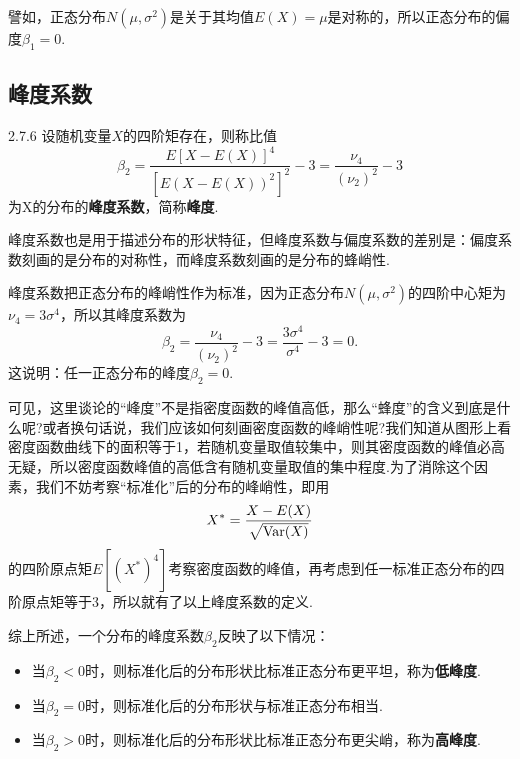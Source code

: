 譬如，正态分布$N(\mu,\sigma^2)$是关于其均值$E(X)=\mu$是对称的，所以正态分布的偏度$\beta_1=0$.

\subsection{峰度系数}
\begin{definition}{}{2.7.6}
  设随机变量$X$的四阶矩存在，则称比值
  \begin{equation}\label{eq2.7.10}
    \beta_2 = \frac{E[X-E(X)]^4}{[E(X-E(X))^2]^2} - 3 = \frac{\nu_4}{(\nu_2)^2} -3
  \end{equation}
  为X的分布的\textbf{峰度系数}，简称\textbf{峰度}.
\end{definition}

峰度系数也是用于描述分布的形状特征，但峰度系数与偏度系数的差别是：偏度系数刻画的是分布的对称性，而峰度系数刻画的是分布的蜂峭性.

峰度系数把正态分布的峰峭性作为标准，因为正态分布$N(\mu,\sigma^2)$的四阶中心矩为$\nu_4=3\sigma^4$，所以其峰度系数为
\[
  \beta_2 = \frac{\nu_4}{(\nu_2)^2} - 3 = \frac{3\sigma^4}{\sigma^4} - 3 = 0 .
\]
这说明：任一正态分布的峰度$\beta_2=0$.

可见，这里谈论的“峰度”不是指密度函数的峰值高低，那么“蜂度”的含义到底是什么呢?或者换句话说，我们应该如何刻画密度函数的峰峭性呢?我们知道从图形上看密度函数曲线下的面积等于1，若随机变量取值较集中，则其密度函数的峰值必高无疑，所以密度函数峰值的高低含有随机变量取值的集中程度.为了消除这个因素，我们不妨考察“标准化”后的分布的峰峭性，即用
\[
  X^\ast = \frac{X - E(X)} {\sqrt{\operatorname{Var}(X)}}
\]
的四阶原点矩$E[(X^\ast)^4]$考察密度函数的峰值，再考虑到任一标准正态分布的四阶原点矩等于3，所以就有了以上峰度系数的定义.

综上所述，一个分布的峰度系数$\beta_2$反映了以下情况：

\begin{itemize}
  \item 当$\beta_2<0$时，则标准化后的分布形状比标准正态分布更平坦，称为\textbf{低峰度}.

  \item 当$\beta_2=0$时，则标准化后的分布形状与标准正态分布相当.

  \item 当$\beta_2>0$时，则标准化后的分布形状比标准正态分布更尖峭，称为\textbf{高峰度}.
\end{itemize}

